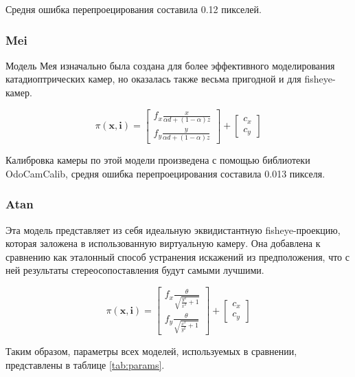 Средня ошибка перепроецирования составила 0.12 пикселей. %

\subsubsection{Mei}

Модель Мея \cite{mei} изначально была создана для более эффективного моделирования катадиоптрических камер, но оказалась также весьма
пригодной и для fisheye-камер. 

\begin{equation}
\pi(\mathbf{x}, \mathbf{i})=\left[\begin{array}{l}
	f_{x} \frac{x}{\alpha d+(1-\alpha) z} \\
	f_{y} \frac{y}{\alpha d+(1-\alpha) z}
	\end{array}\right]+\left[\begin{array}{l}
	c_{x} \\
	c_{y}
	\end{array}\right]
\end{equation}

Калибровка камеры по этой модели произведена с помощью библиотеки OdoCamCalib, средня ошибка перепроецирования 
составила 0.013 пикселя.

\subsubsection{Atan}

Эта модель представляет из себя идеальную эквидистантную fisheye-проекцию, которая заложена в использованную виртуальную камеру. 
Она добавлена к сравнению как эталонный способ устранения искажений из предположения, что с ней результаты стереосопоставления будут 
самыми лучшими.  

\begin{equation}
	\pi(\mathbf{x}, \mathbf{i})=\left[\begin{array}{l}
		f_{x} \frac{\theta}{ \sqrt{ \frac{y^2}{x^2} + 1 }} \\
		f_{y} \frac{\theta}{ \sqrt{ \frac{x^2}{y^2} + 1 }}
		\end{array}\right]+\left[\begin{array}{l}
		c_{x} \\
		c_{y}
		\end{array}\right]
	\end{equation}


Таким образом, параметры всех моделей, используемых в сравнении, представлены в таблице \ref{tab:params}.

